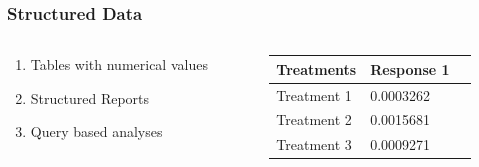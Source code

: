 \documentclass{beamer}
\begin{document}

\begin{frame}
\frametitle{Structured Data}



\begin{columns}[c] %
\begin{column}{0.5\textwidth}
\begin{enumerate}
\item Tables with numerical values
\item Structured Reports
\item Query based analyses
\end{enumerate}
\end{column}
\begin{column}{0.5\textwidth}

\begin{table}
\begin{tabular}{l l l}
\toprule
\textbf{Treatments} & \textbf{Response 1} \\
\midrule
Treatment 1 & 0.0003262 \\
Treatment 2 & 0.0015681 \\
Treatment 3 & 0.0009271 \\
\bottomrule
\end{tabular}
\end{table}
\end{column}
\end{columns}
\end{frame}

\end{document}
